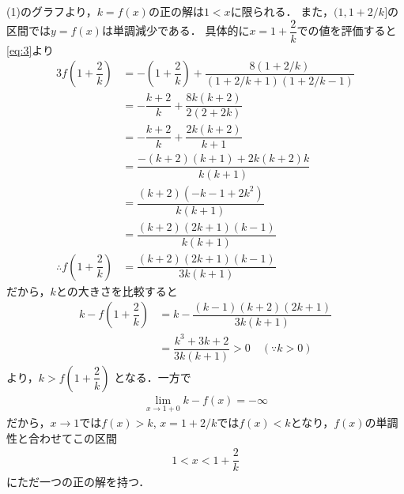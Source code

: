 \documentclass[../../main.tex]{subfiles}
\begin{document}
(1)のグラフより，$k=f(x)$の正の解は$1<x$に限られる．
また，$(1,1+2/k]$の区間では$y=f(x)$は単調減少である．
具体的に$x=1+\dfrac{2}{k}$での値を評価すると\cref{eq:3}より
\begin{align}
  3f\left(1+\dfrac{2}{k}\right)
  & = -\left(1+\dfrac{2}{k}\right) + \dfrac{8(1+2/k)}{(1+2/k+1)(1+2/k-1)} \\
  & = -\dfrac{k+2}{k} + \dfrac{8k(k+2)}{2(2+2k)} \\
  & = -\dfrac{k+2}{k} + \dfrac{2k(k+2)}{k+1} \\
  & = \dfrac{-(k+2)(k+1)+2k(k+2)k}{k(k+1)} \\
  & = \dfrac{(k+2)(-k-1+2k^2)}{k(k+1)} \\
  & = \dfrac{(k+2)(2k+1)(k-1)}{k(k+1)} \\
  \therefore
  f\left(1+\dfrac{2}{k}\right)
  & = \dfrac{(k+2)(2k+1)(k-1)}{3k(k+1)}
\end{align}
だから，$k$との大きさを比較すると
\begin{align}
  k - f\left(1+\dfrac{2}{k}\right)
  & = k - \dfrac{(k-1)(k+2)(2k+1)}{3k(k+1)} \\
  & = \dfrac{k^3+3k+2}{3k(k+1)} > 0 \quad (\because k > 0)
\end{align}
より，$k > f\left(1+\dfrac{2}{k}\right)$ となる．一方で
\begin{align}
  \lim_{x\to 1+0} k-f(x) = -\infty
\end{align}
だから，$x\to 1$では$f(x)>k$, $x=1+2/k$では$f(x)<k$となり，$f(x)$の単調性と合わせてこの区間
\begin{align}
  1 < x < 1 + \dfrac{2}{k}
\end{align}
にただ一つの正の解を持つ．

\newpage
\end{document}
